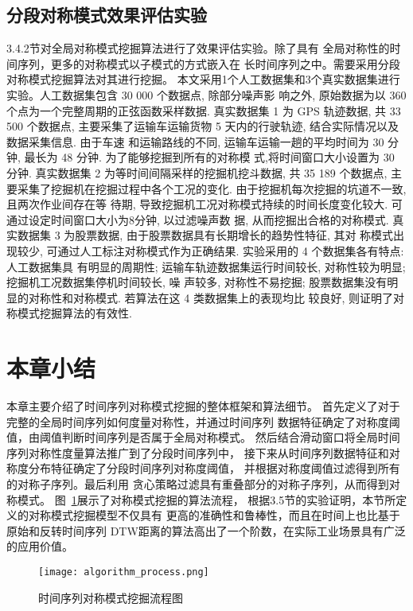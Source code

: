 \subsection{分段对称模式效果评估实验}
3.4.2节对全局对称模式挖掘算法进行了效果评估实验。除了具有
全局对称性的时间序列，更多的对称模式以子模式的方式嵌入在
长时间序列之中。需要采用分段对称模式挖掘算法对其进行挖掘。
本文采用1个人工数据集和3个真实数据集进行实验。人工数据集包含 30 000 个数据点, 除部分噪声影
响之外, 原始数据为以 360 个点为一个完整周期的正弦函数采样数据. 真实数据集 1 为 GPS 轨迹数据, 共
33 500 个数据点, 主要采集了运输车运输货物 5 天内的行驶轨迹, 结合实际情况以及数据采集信息. 由于车速
和运输路线的不同, 运输车运输一趟的平均时间为 30 分钟, 最长为 48 分钟. 为了能够挖掘到所有的对称模
式,将时间窗口大小设置为 30 分钟. 真实数据集 2 为等时间间隔采样的挖掘机挖斗数据, 共 35 189 个数据点,
主要采集了挖掘机在挖掘过程中各个工况的变化. 由于挖掘机每次挖掘的坑道不一致, 且两次作业间存在等
待期, 导致挖掘机工况对称模式持续的时间长度变化较大. 可通过设定时间窗口大小为8分钟, 以过滤噪声数
据, 从而挖掘出合格的对称模式. 真实数据集 3 为股票数据, 由于股票数据具有长期增长的趋势性特征, 其对
称模式出现较少, 可通过人工标注对称模式作为正确结果. 实验采用的 4 个数据集各有特点: 人工数据集具
有明显的周期性; 运输车轨迹数据集运行时间较长, 对称性较为明显; 挖掘机工况数据集停机时间较长, 噪
声较多, 对称性不易挖掘; 股票数据集没有明显的对称性和对称模式. 若算法在这 4 类数据集上的表现均比
较良好, 则证明了对称模式挖掘算法的有效性. 

\section{本章小结}
本章主要介绍了时间序列对称模式挖掘的整体框架和算法细节。
首先定义了对于完整的全局时间序列如何度量对称性，并通过时间序列
数据特征确定了对称度阈值，由阈值判断时间序列是否属于全局对称模式。
然后结合滑动窗口将全局时间序列对称性度量算法推广到了分段时间序列中，
接下来从时间序列数据特征和对称度分布特征确定了分段时间序列对称度阈值，
并根据对称度阈值过滤得到所有的对称子序列。最后利用
贪心策略过滤具有重叠部分的对称子序列，从而得到对称模式。
图~\ref{fig:algorithm_process}展示了对称模式挖掘的算法流程，
根据3.5节的实验证明，本节所定义的对称模式挖掘模型不仅具有
更高的准确性和鲁棒性，而且在时间上也比基于原始和反转时间序列
DTW距离的算法高出了一个阶数，在实际工业场景具有广泛的应用价值。
\begin{figure}[h]
  \centering
  \texttt{[image: algorithm\_process.png]}
  \caption{时间序列对称模式挖掘流程图}
  \label{fig:algorithm_process}
\end{figure}